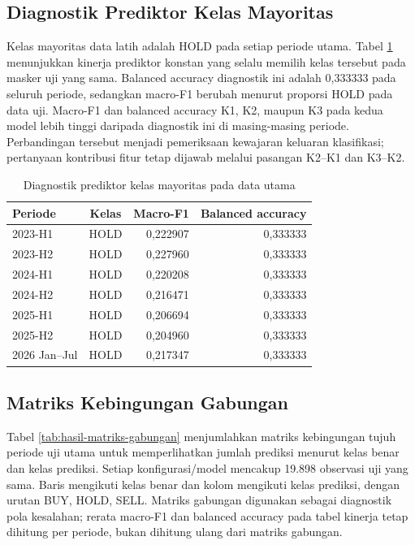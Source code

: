 \subsection{Diagnostik Prediktor Kelas Mayoritas}

Kelas mayoritas data latih adalah HOLD pada setiap periode utama. Tabel \ref{tab:hasil-mayoritas} menunjukkan kinerja prediktor konstan yang selalu memilih kelas tersebut pada masker uji yang sama. Balanced accuracy diagnostik ini adalah 0,333333 pada seluruh periode, sedangkan macro-F1 berubah menurut proporsi HOLD pada data uji. Macro-F1 dan balanced accuracy K1, K2, maupun K3 pada kedua model lebih tinggi daripada diagnostik ini di masing-masing periode. Perbandingan tersebut menjadi pemeriksaan kewajaran keluaran klasifikasi; pertanyaan kontribusi fitur tetap dijawab melalui pasangan K2--K1 dan K3--K2.


\begin{table}[htbp]
\centering
\small
\setlength{\tabcolsep}{4pt}
\caption{Diagnostik prediktor kelas mayoritas pada data utama}
\label{tab:hasil-mayoritas}
\begin{tabular}{lcrr}
\toprule
Periode & Kelas & Macro-F1 & Balanced accuracy \\
\midrule
2023-H1 & HOLD & 0,222907 & 0,333333 \\
2023-H2 & HOLD & 0,227960 & 0,333333 \\
2024-H1 & HOLD & 0,220208 & 0,333333 \\
2024-H2 & HOLD & 0,216471 & 0,333333 \\
2025-H1 & HOLD & 0,206694 & 0,333333 \\
2025-H2 & HOLD & 0,204960 & 0,333333 \\
2026 Jan--Jul & HOLD & 0,217347 & 0,333333 \\
\bottomrule
\end{tabular}
\end{table}


\subsection{Matriks Kebingungan Gabungan}

Tabel \ref{tab:hasil-matriks-gabungan} menjumlahkan matriks kebingungan tujuh periode uji utama untuk memperlihatkan jumlah prediksi menurut kelas benar dan kelas prediksi. Setiap konfigurasi/model mencakup 19.898 observasi uji yang sama. Baris mengikuti kelas benar dan kolom mengikuti kelas prediksi, dengan urutan BUY, HOLD, SELL. Matriks gabungan digunakan sebagai diagnostik pola kesalahan; rerata macro-F1 dan balanced accuracy pada tabel kinerja tetap dihitung per periode, bukan dihitung ulang dari matriks gabungan.


